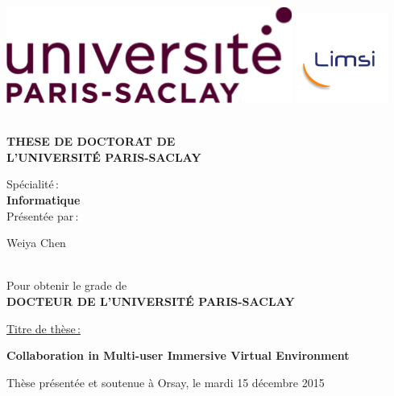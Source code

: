 \begin{titlepage}

\includegraphics[height=2.cm]{./logos/logo_saclay}\hfill
\includegraphics[height=3cm]{./logos/LogoLimsi2015}\hfill
\\
\\

\begin{center}
  \begin{Large}
    \textbf{THESE DE DOCTORAT DE\\ L'UNIVERSIT\'E PARIS-SACLAY\\}
  \end{Large}
  Sp\'ecialit\'e\,:\\
  \textbf{Informatique}\\ 
  Pr\'esent\'ee par\,:\\ 
  \begin{LARGE}
    Weiya Chen\end{LARGE}\\
  Pour obtenir le grade de\\
  \textbf{DOCTEUR DE L'UNIVERSIT\'E PARIS-SACLAY}
\end{center}

\noindent \underline{Titre de thèse\,:}\\
\begin{center}
  \begin{Large}
    {\textbf{Collaboration in Multi-user Immersive Virtual Environment}}
  \end{Large}
\end{center}

Thèse présentée et soutenue à Orsay, le mardi 15 décembre 2015\\


\end{titlepage}
